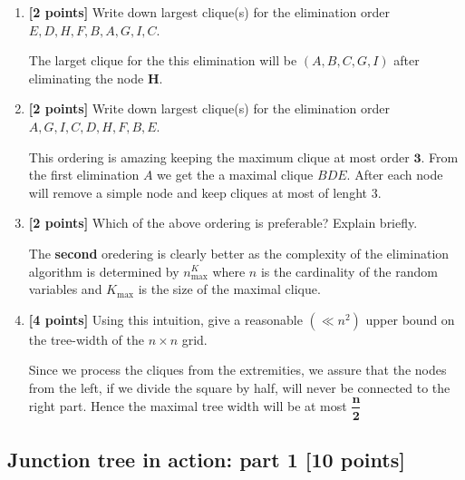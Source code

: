 \documentclass[12pt]{article} \usepackage[utf8]{inputenc}
\begin{document}
\begin{enumerate}

\item \textbf{[2 points]} Write down largest clique(s) for the elimination order $ E, D, H, F, B, A, G, I, C $.

\begin{solution}
    The larget clique for the this elimination will be $(A, B, C, G, I)$
    after eliminating the node $\mathbf{H}$.
  
\end{solution}

\item \textbf{[2 points]} Write down largest clique(s) for the elimination order $ A, G, I, C, D, H, F, B, E $. 

\begin{solution}
  This ordering is amazing keeping the maximum clique at most order
  $\mathbf{3}$. From the first elimination $A$ we get the a maximal clique
  $BDE$. After each node will remove a simple node and keep cliques at most
  of lenght $3$.
\end{solution}

\item \textbf{[2 points]} Which of the above ordering is preferable? Explain briefly. 

\begin{solution}
  The \textbf{second} oredering is clearly better as the complexity of the
  elimination algorithm is determined by $n^K_{\text{max}}$ where
  $n$ is the cardinality of the random variables and $K_{\text{max}}$ is the
  size of the maximal clique.
\end{solution}

\item \textbf{[4 points]} Using this intuition, give a reasonable $ (\ll n^2) $ upper bound on the tree-width of the $ n \times n $ grid. 

  \begin{solution}
   Since we process the cliques from the extremities, we assure that the
   nodes from the left, if we divide the square by half, will never be
   connected to the right part. Hence the maximal tree width will be at
   most $\mathbf{\dfrac{n}{2}}$ 
  \end{solution}


\end{enumerate}

\subsection{Junction tree in action: part 1 [10 points]}
\end{document}
